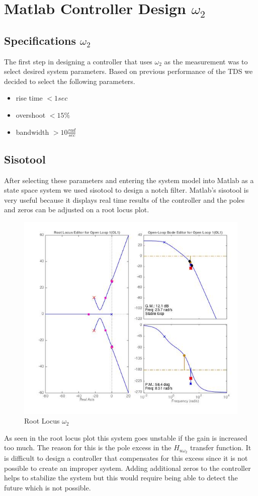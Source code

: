 \documentclass[11pt,titlepage]{article}
\begin{document}
\section{Matlab Controller Design $\omega_2$}

	\subsection{Specifications $\omega_2$}
		The first step in designing a controller that uses $\omega_2$ as the measurement was to select desired system parameters. Based on previous performance of the TDS we decided to select the following parameters.
		\begin{itemize}
			\item rise time $< 1sec$
			\item overshoot $< 15\%$
			\item bandwidth $> 10 \frac{rad}{sec}$
		\end{itemize}

	\subsection{Sisotool}
		After selecting these parameters and entering the system model into Matlab as a state space system we used sisotool to design a notch filter. Matlab's sisotool is very useful because it displays real time results of the controller and the poles and zeros can be adjusted on a root locus plot.
		\begin{figure}[H]
			\centering
			\includegraphics[scale=0.4]{rlocusw2}
			\caption{Root Locus $\omega_2$}
		\end{figure}
		As seen in the root locus plot this system goes unstable if the gain is increased too much. The reason for this is the pole excess in the $H_{u\omega_2}$ transfer function. It is difficult to design a controller that compensates for this excess since it is not possible to create an improper system. Adding additional zeros to the controller helps to stabilize the system but this would require being able to detect the future which is not possible.
\end{document}
